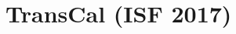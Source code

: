 \documentclass[11pt]{article}
\begin{document}
\section*{TransCal (ISF 2017)}








\end{document}
